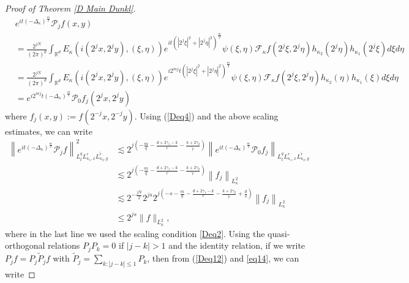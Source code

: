 \documentclass[a4paper,11pt, reqno]{amsart}
\theoremstyle{definition}
\theoremstyle{remark}
\numberwithin{equation}{section}
\begin{document}
\begin{proof}[Proof of  Theorem \ref{D Main Dunkl}]
		$$
		\begin{aligned}
			&	e^{i t(-\Delta_\kappa)^{\frac{m}{2}}} \mathcal{P}_j  f(x, y) \\&= \frac{2^{jN}}{(2 \pi)^d} \int_{\mathbb{R}^{d}}      E_{\kappa}(i(2^jx, 2^jy),(\xi, \eta) ) e^{it (|2^j\xi|^2+|2^j\eta|^2)^{\frac{m}{2}}}   \psi(\xi, \eta) \mathcal{F}_\kappa{f} ( 2^j\xi, 2^j \eta )   h_{\kappa_2}(2^j\eta )   h_{\kappa_1}(2^j\xi) d \xi  d \eta\\
			& = \frac{2^{jN}}{(2 \pi)^d} \int_{\mathbb{R}^{d}}      E_{\kappa}(i(2^jx, 2^jy),(\xi, \eta) ) e^{i2^{mj} t (|2^j\xi|^2+|2^j\eta|^2)^{\frac{m}{2}}}   \psi(\xi, \eta) \mathcal{F}_\kappa{f} ( 2^j\xi, 2^j \eta )   h_{\kappa_2}(\eta )   h_{\kappa_1}(\xi) d \xi  d \eta\\
			&
			=e^{i 2^{mj} t(-\Delta_\kappa)^{\frac{m}{2}}} \mathcal{P}_0 f_j\left(2^j x, 2^j y\right)
		\end{aligned}
		$$
		where $f_j(x, y):=f\left(2^{-j} x, 2^{-j} y\right)$.  Using (\ref{Deq4}) and the above scaling estimates,  we can write 
		\begin{align}\label{eq14}\nonumber
			\left\|e^{i t(-\Delta_\kappa)^{\frac{m}{2}}} \mathcal{P}_j  f\right\|_{L_t^q L_{\kappa_1, x}^r L_{\kappa_2, y}^{\tilde{r}}}^2 
			&   \lesssim 2^{j\left(-\frac{{m}}{q}-\frac{d+2\gamma_1-k}{r}-\frac{k+2\gamma_2}{\tilde{r}}\right)}\left\|e^{i t(-\Delta_\kappa)^{\frac{m}{2}}} \mathcal{P}_0 f_j\right\|_{L_t^q L_{\kappa_1, x}^r L_{\kappa_2, y}^{\tilde{r}}} \\\nonumber
			& \lesssim 2^{j\left(-\frac{{{m}}}{q}-\frac{d+2\gamma_1-k}{r}-\frac{k+2\gamma_2}{\tilde{r}}\right)}\left\|f_j\right\|_{L_{\kappa}^2} \\\nonumber
			& \lesssim  2^{-\frac{jN}{2}}2^{js}2^{j\left(-s-\frac{{{m}}}{q}-\frac{d+2\gamma_1-k}{r}-\frac{k+2\gamma_2}{\tilde{r}}+\frac{d}{2}\right)}\left\|f_j\right\|_{L_{\kappa}^2} \\
			& \leq  2^{j s}\|f\|_{L_{\kappa}^2},
		\end{align}
		where in the last line we used the scaling condition \eqref{Deq2}.  Using the 		quasi-orthogonal relations $P_jP_k=0$ if $|j-k|>1$ and the identity relation,   if we write $P_j f=P_j \widetilde{P}_j f$   with $\widetilde{P}_j=\sum_{k:|j-k| \leq 1} P_k$, then   from    (\ref{Deq12}) and \eqref{eq14}, we can write  

\end{proof}
\end{document}
